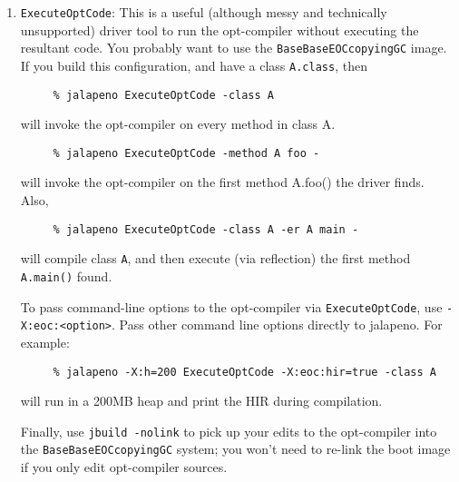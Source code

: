 \begin{description}
\begin{enumerate}
\item {\tt ExecuteOptCode}:  This is a useful (although messy
and technically unsupported) driver  tool to run the opt-compiler without
executing the resultant code.  You probably want to use the
{\tt BaseBaseEOCcopyingGC} image.  If you build this configuration, and have a
class {\tt A.class}, then
\begin{verbatim}
     % jalapeno ExecuteOptCode -class A
\end{verbatim}
will invoke the opt-compiler on every method in class A.
\begin{verbatim}
     % jalapeno ExecuteOptCode -method A foo -
\end{verbatim}
will invoke the opt-compiler on the first method A.foo() the driver finds.
Also,
\begin{verbatim}
     % jalapeno ExecuteOptCode -class A -er A main -
\end{verbatim}
will compile class {\tt A}, and then execute (via reflection) the first method
{\tt A.main()} found.

To pass command-line options to the opt-compiler via {\tt ExecuteOptCode}, use
{\tt -X:eoc:<option>}.  Pass other command line options directly to jalapeno.
For example:
\begin{verbatim}
     % jalapeno -X:h=200 ExecuteOptCode -X:eoc:hir=true -class A
\end{verbatim}
will run in a 200MB heap and print the HIR during compilation.

Finally, use {\tt jbuild -nolink} to pick up your edits to the
opt-compiler into the {\tt BaseBaseEOCcopyingGC} system; you won't need to
re-link the boot image if you only edit opt-compiler sources.

\end{enumerate}
\end{description}


